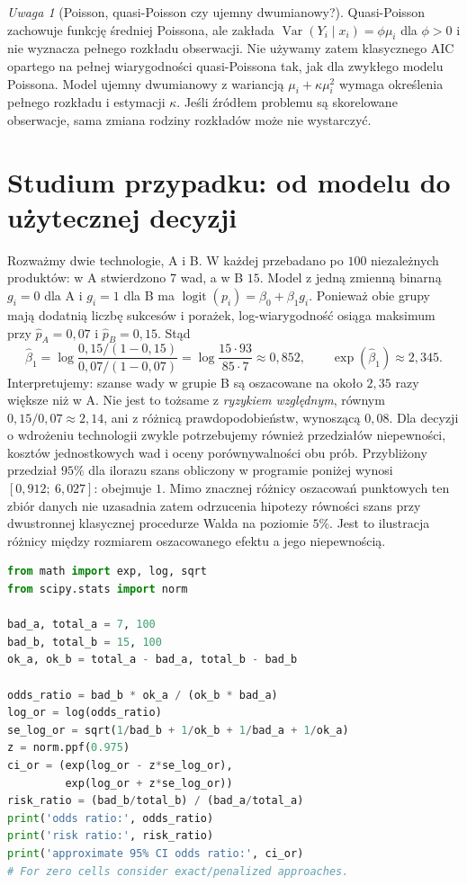 \documentclass[11pt,a4paper,oneside]{report}
\numberwithin{equation}{chapter}
\theoremstyle{plain}
\theoremstyle{definition}
\theoremstyle{remark}
\newtheorem{uwaga}{Uwaga}[chapter]
\newcommand{\Var}{\operatorname{Var}}
\begin{document}
\begin{uwaga}[Poisson, quasi-Poisson czy ujemny dwumianowy?]
Quasi-Poisson zachowuje funkcję średniej Poissona,
ale zakłada $\Var(Y_i\mid x_i)=\phi\mu_i$ dla
$\phi>0$ i nie wyznacza pełnego rozkładu obserwacji.
Nie używamy zatem klasycznego AIC opartego na
pełnej wiarygodności quasi-Poissona tak, jak dla
zwykłego modelu Poissona. Model ujemny dwumianowy
z wariancją $\mu_i+\kappa\mu_i^2$ wymaga określenia
pełnego rozkładu i estymacji $\kappa$.
Jeśli źródłem problemu są skorelowane obserwacje,
sama zmiana rodziny rozkładów może nie wystarczyć.
\end{uwaga}

\section{Studium przypadku: od modelu do użytecznej decyzji}
Rozważmy dwie technologie, A i B. W każdej przebadano
po $100$ niezależnych produktów: w A stwierdzono
$7$ wad, a w B $15$. Model z jedną zmienną binarną
$g_i=0$ dla A i $g_i=1$ dla B ma
$\operatorname{logit}(p_i)=\beta_0+\beta_1g_i$.
Ponieważ obie grupy mają dodatnią liczbę sukcesów
i porażek, log-wiarygodność osiąga maksimum
przy $\widehat p_A=0{,}07$ i $\widehat p_B=0{,}15$.
Stąd
\[
 \widehat\beta_1=
 \log\frac{0{,}15/(1-0{,}15)}{0{,}07/(1-0{,}07)}
 =\log\frac{15\cdot93}{85\cdot7}
 \approx0{,}852,\qquad
 \exp(\widehat\beta_1)\approx2{,}345.
\]
Interpretujemy: szanse wady w grupie B są oszacowane
na około $2{,}35$ razy większe niż w A. Nie jest to
tożsame z \emph{ryzykiem względnym}, równym
$0{,}15/0{,}07\approx2{,}14$, ani z różnicą
prawdopodobieństw, wynoszącą $0{,}08$.
Dla decyzji o wdrożeniu technologii zwykle potrzebujemy
również przedziałów niepewności, kosztów jednostkowych
wad i oceny porównywalności obu prób. Przybliżony
przedział $95\%$ dla ilorazu szans obliczony w programie
poniżej wynosi $[0{,}912;\ 6{,}027]$: obejmuje $1$.
Mimo znacznej różnicy oszacowań punktowych ten zbiór
danych nie uzasadnia zatem odrzucenia hipotezy równości
szans przy dwustronnej klasycznej procedurze Walda
na poziomie $5\%$. Jest to ilustracja różnicy między
rozmiarem oszacowanego efektu a jego niepewnością.

\begin{lstlisting}[language=Python,caption={Kompletny program: dwie grupy binarne, iloraz szans i przedział przybliżony (Python).}]
from math import exp, log, sqrt
from scipy.stats import norm

bad_a, total_a = 7, 100
bad_b, total_b = 15, 100
ok_a, ok_b = total_a - bad_a, total_b - bad_b

odds_ratio = bad_b * ok_a / (ok_b * bad_a)
log_or = log(odds_ratio)
se_log_or = sqrt(1/bad_b + 1/ok_b + 1/bad_a + 1/ok_a)
z = norm.ppf(0.975)
ci_or = (exp(log_or - z*se_log_or),
         exp(log_or + z*se_log_or))
risk_ratio = (bad_b/total_b) / (bad_a/total_a)
print('odds ratio:', odds_ratio)
print('risk ratio:', risk_ratio)
print('approximate 95% CI odds ratio:', ci_or)
# For zero cells consider exact/penalized approaches.
\end{lstlisting}
\end{document}
